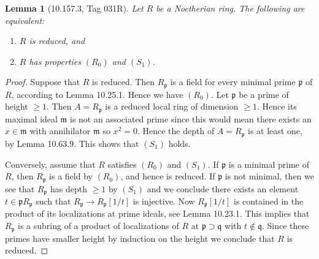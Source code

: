 \documentclass[UTF8,11pt]{ctexart}
\newtheorem*{lemma}{Lemma}
\begin{document}
\begin{lemma}[10.157.3, Tag 031R]
Let $R$ be a Noetherian ring. The following are equivalent:
\begin{enumerate}
\item $R$ is reduced, and
\item $R$ has properties $(R_0)$ and $(S_1)$.
\end{enumerate}
\end{lemma}
\begin{proof}
Suppose that $R$ is reduced. Then $R_{\mathfrak p}$ is a field for every minimal prime $\mathfrak p$ of $R$, according to Lemma 10.25.1. Hence we have $(R_0)$. Let $\mathfrak p$ be a prime of height $\geq1$. Then $A=R_{\mathfrak p}$ is a reduced local ring of dimension $\geq1$. Hence its maximal ideal $\mathfrak m$ is not an associated prime since this would mean there exists an $x\in\mathfrak m$ with annihilator $\mathfrak m$ so $x^2=0$. Hence the depth of $A=R_{\mathfrak p}$ is at least one, by Lemma 10.63.9. This shows that $(S_1)$ holds.

Conversely, assume that $R$ satisfies $(R_0)$ and $(S_1)$. If $\mathfrak p$ is a minimal prime of $R$, then $R_{\mathfrak p}$ is a field by $(R_0)$, and hence is reduced. If $\mathfrak p$ is not minimal, then we see that $R_{\mathfrak p}$ has depth $\geq1$ by $(S_1)$ and we conclude there exists an element $t\in\mathfrak pR_{\mathfrak p}$ such that $R_{\mathfrak p}\to R_{\mathfrak p}[1/t]$ is injective. Now $R_{\mathfrak p}[1/t]$ is contained in the product of its localizations at prime ideals, see Lemma 10.23.1. This implies that $R_{\mathfrak p}$ is a subring of a product of localizations of $R$ at $\mathfrak p\supset\mathfrak q$ with $t\notin\mathfrak q$. Since these primes have smaller height by induction on the height we conclude that $R$ is reduced.
\end{proof}
\end{document}
